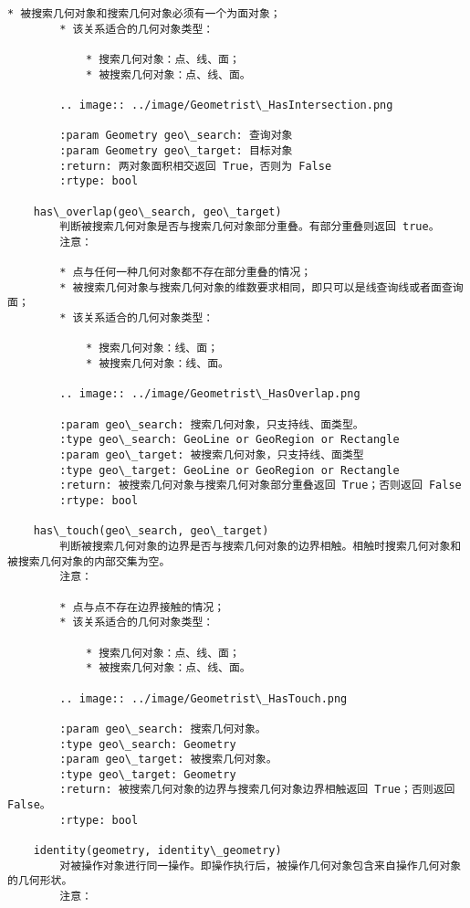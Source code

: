 \documentclass[11pt]{article}
\begin{document}
\begin{Verbatim}[commandchars=\\\{\}]
        * 被搜索几何对象和搜索几何对象必须有一个为面对象；
        * 该关系适合的几何对象类型：
        
            * 搜索几何对象：点、线、面；
            * 被搜索几何对象：点、线、面。
        
        .. image:: ../image/Geometrist\_HasIntersection.png
        
        :param Geometry geo\_search: 查询对象
        :param Geometry geo\_target: 目标对象
        :return: 两对象面积相交返回 True，否则为 False
        :rtype: bool
    
    has\_overlap(geo\_search, geo\_target)
        判断被搜索几何对象是否与搜索几何对象部分重叠。有部分重叠则返回 true。
        注意：
        
        * 点与任何一种几何对象都不存在部分重叠的情况；
        * 被搜索几何对象与搜索几何对象的维数要求相同，即只可以是线查询线或者面查询面；
        * 该关系适合的几何对象类型：
        
            * 搜索几何对象：线、面；
            * 被搜索几何对象：线、面。
        
        .. image:: ../image/Geometrist\_HasOverlap.png
        
        :param geo\_search: 搜索几何对象，只支持线、面类型。
        :type geo\_search: GeoLine or GeoRegion or Rectangle
        :param geo\_target: 被搜索几何对象，只支持线、面类型
        :type geo\_target: GeoLine or GeoRegion or Rectangle
        :return: 被搜索几何对象与搜索几何对象部分重叠返回 True；否则返回 False
        :rtype: bool
    
    has\_touch(geo\_search, geo\_target)
        判断被搜索几何对象的边界是否与搜索几何对象的边界相触。相触时搜索几何对象和被搜索几何对象的内部交集为空。
        注意：
        
        * 点与点不存在边界接触的情况；
        * 该关系适合的几何对象类型：
        
            * 搜索几何对象：点、线、面；
            * 被搜索几何对象：点、线、面。
        
        .. image:: ../image/Geometrist\_HasTouch.png
        
        :param geo\_search: 搜索几何对象。
        :type geo\_search: Geometry
        :param geo\_target: 被搜索几何对象。
        :type geo\_target: Geometry
        :return: 被搜索几何对象的边界与搜索几何对象边界相触返回 True；否则返回 False。
        :rtype: bool
    
    identity(geometry, identity\_geometry)
        对被操作对象进行同一操作。即操作执行后，被操作几何对象包含来自操作几何对象的几何形状。
        注意：
        

\end{Verbatim}
\end{document}
